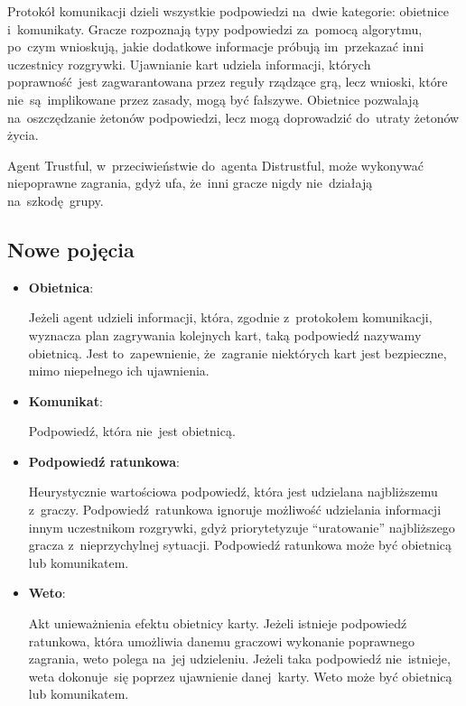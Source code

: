 \documentclass[declaration,shortabstract,inz]{iithesis}
\begin{document}
Protokół komunikacji dzieli wszystkie podpowiedzi na~dwie kategorie: obietnice i~komunikaty. Gracze rozpoznają typy podpowiedzi za~pomocą algorytmu, po~czym wnioskują, jakie dodatkowe informacje próbują im~przekazać inni uczestnicy rozgrywki. Ujawnianie kart udziela informacji, których poprawność jest zagwarantowana przez reguły rządzące grą, lecz wnioski, które nie~są~implikowane przez zasady, mogą być fałszywe. Obietnice pozwalają na~oszczędzanie żetonów podpowiedzi, lecz mogą doprowadzić do~utraty żetonów życia.

Agent Trustful, w~przeciwieństwie do~agenta Distrustful, może wykonywać niepoprawne zagrania, gdyż ufa, że~inni gracze nigdy nie~działają na~szkodę grupy.

\subsection*{Nowe pojęcia}

\begin{itemize}
	\item \textbf{Obietnica}:
	
	Jeżeli agent udzieli informacji, która, zgodnie z~protokołem komunikacji, wyznacza plan zagrywania kolejnych kart, taką podpowiedź nazywamy obietnicą. Jest to~zapewnienie, że~zagranie niektórych kart jest bezpieczne, mimo niepełnego ich ujawnienia.
	
	\item \textbf{Komunikat}:
	
	Podpowiedź, która nie~jest obietnicą.
	
	\item \textbf{Podpowiedź ratunkowa}:
	
	Heurystycznie wartościowa podpowiedź, która jest udzielana najbliższemu z~graczy. Podpowiedź ratunkowa ignoruje możliwość udzielania informacji innym uczestnikom rozgrywki, gdyż priorytetyzuje ``uratowanie'' najbliższego gracza z~nieprzychylnej sytuacji. Podpowiedź ratunkowa może być obietnicą lub komunikatem.
	
	\item \textbf{Weto}:
	
	Akt unieważnienia efektu obietnicy karty. Jeżeli istnieje podpowiedź ratunkowa, która umożliwia danemu graczowi wykonanie poprawnego zagrania, weto polega na~jej udzieleniu. Jeżeli taka podpowiedź nie~istnieje, weta dokonuje~się poprzez ujawnienie danej karty. Weto może być obietnicą lub komunikatem.

\end{itemize}
\end{document}
